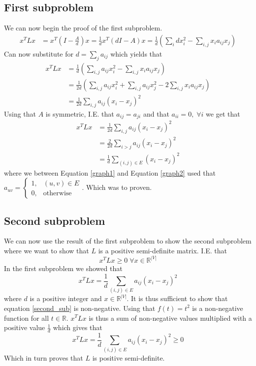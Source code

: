\subsection*{First subproblem}

We can now begin the proof of the first subproblem.
\begin{align*}
  x^T L x & = x^T(I-\frac{A}{d})x = \frac{1}{d} x^T (dI - A) x = \frac{1}{d} (\sum_i d x_i^2 - \sum_{i,j}x_i a_{ij} x_j)
\end{align*}
Can now substitute for $d = \sum_j{a_{ij}}$ which yields that
\begin{align*}
  x^T L x & = \frac{1}{d} (\sum_{i,j} a_{ij} x_i^2 - \sum_{i,j}x_i a_{ij} x_j) \\
  & = \frac{1}{2d} (\sum_{i,j} a_{ij} x_i^2 + \sum_{i,j} a_{ij} x_j^2 - 2\sum_{i,j}x_i a_{ij} x_j) \\
  & = \frac{1}{2d} \sum_{i,j} a_{ij}(x_i-x_j)^2
\end{align*}
Using that $A$ is symmetric, I.E. that $a_{ij} = a_{ji}$ and that $a_{ii} = 0, \; \forall i$ we get that
\begin{align}
  x^T L x & = \frac{1}{2d} \sum_{i,j} a_{ij}(x_i-x_j)^2 \nonumber \\
  & = \frac{2}{2d} \sum_{i>j} a_{ij}(x_i-x_j)^2 \label{graph1} \\
  & = \frac{1}{d} \sum_{(i,j) \in E} (x_i-x_j)^2 \label{graph2}
\end{align}
where we between Equation \eqref{graph1} and Equation \eqref{graph2} used that $a_{uv} = \begin{cases} 1, & (u,v) \in E \\ 0, & \text{otherwise}\end{cases}$. Which was to proven.

\subsection*{Second subproblem}
We can now use the result of the first subproblem to show the second subproblem where we want to show that $L$ is a positive semi-definite matrix. I.E. that
\begin{equation}
  x^T L x \geq 0 \; \forall x \in \mathbb{R}^{|V|}
\end{equation}
In the first subproblem we showed that
\begin{equation}
  x^T L x = \frac{1}{d} \sum_{(i,j) \in E} a_{ij}(x_i-x_j)^2
  \label{second_sub}
\end{equation}
where $d$ is a positive integer and $x \in \mathbb{R}^{|V|}$. It is thus sufficient to show that equation \eqref{second_sub} is non-negative. Using that $f(t) = t^2$ is a non-negative function for all $t \in \mathbb{R}$. $x^T L x$ is thus a sum of non-negative values multiplied with a positive value $\frac{1}{d}$ which gives that
\begin{equation}
  x^T L x = \frac{1}{d} \sum_{(i,j) \in E} a_{ij}(x_i-x_j)^2 \geq 0
\end{equation}
Which in turn proves that $L$ is positive semi-definite.


